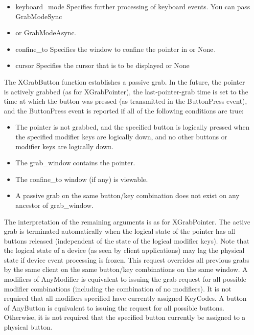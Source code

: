 \documentclass{report}
\begin{document}
\begin{itemize}
\begin{itemize}
                \item keyboard\_mode Specifies further processing of keyboard events. You can pass GrabModeSync
                \item or GrabModeAsync.
                \item confine\_to Specifies the window to confine the pointer in or None.
                \item cursor Specifies the cursor that is to be displayed or None
            \end{itemize}
            The XGrabButton function establishes a passive grab. In the future, the pointer is actively grabbed (as for XGrabPointer), the last-pointer-grab time is set to the time at which the button was pressed (as transmitted in the ButtonPress event), and the ButtonPress event is reported if all of the following conditions are true:
            \begin{itemize}
                \item The pointer is not grabbed, and the specified button is logically pressed when the specified modifier keys are logically down, and no other buttons or modifier keys are logically down.
                \item The grab\_window contains the pointer.
                \item The confine\_to window (if any) is viewable.
                \item A passive grab on the same button/key combination does not exist on any ancestor of grab\_window.
            \end{itemize}
            The interpretation of the remaining arguments is as for XGrabPointer. The active grab is terminated automatically when the logical state of the pointer has all buttons released (independent of the state of the logical modifier keys).
            \bigbreak \noindent 
            Note that the logical state of a device (as seen by client applications) may lag the physical state if device event processing is frozen.
            \bigbreak \noindent 
            This request overrides all previous grabs by the same client on the same button/key combinations on the same window. A modifiers of AnyModifier is equivalent to issuing the grab request for all possible modifier combinations (including the combination of no modifiers). It is not required that all modifiers specified have currently assigned KeyCodes. A button of AnyButton is equivalent to issuing the request for all possible buttons. Otherwise, it is not required that the specified button currently be assigned to a physical button.

\end{itemize}
\end{document}
